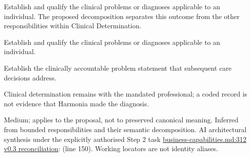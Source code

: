 Establish and qualify the clinical problems or diagnoses applicable to an individual. The proposed decomposition separates this outcome from the other responsibilities within Clinical Determination.



Establish and qualify the clinical problems or diagnoses applicable to an individual.



Establish the clinically accountable problem statement that subsequent care decisions address.



Clinical determination remains with the mandated professional; a coded record is not evidence that Harmonia made the diagnosis.


Medium; applies to the proposal, not to preserved canonical meaning.
Inferred from bounded responsibilities and their semantic decomposition. AI architectural synthesis under the explicitly authorised Step 2 task \hyperref[evidence:a4c0900c47c945d9]{business-capabilities.md:312}
\hyperref[model:reconciliation]{v0.3 reconciliation}: \texttt{} (line 150). Working locators are not identity aliases.
